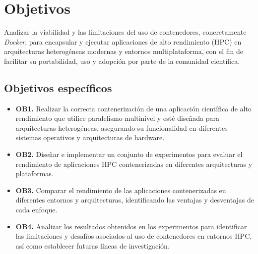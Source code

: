\section{Objetivos}\label{sec:objetivos}

Analizar la viabilidad y las limitaciones del uso de contenedores, concretamente \textit{Docker}, para encapsular y ejecutar aplicaciones de alto rendimiento (HPC) en arquitecturas heterogéneas modernas y entornos multiplataforma, con el fin de facilitar su portabilidad, uso y adopción por parte de la comunidad científica.

\subsection{Objetivos específicos}\label{subsec:objetivos_especificos}

\begin{itemize}
   \item \textbf{OB1.} Realizar la correcta contenerización de una aplicación científica de alto rendimiento que utilice paralelismo multinivel y esté diseñada para arquitecturas heterogéneas, asegurando su funcionalidad en diferentes sistemas operativos y arquitecturas de hardware.
   \item \textbf{OB2.} Diseñar e implementar un conjunto de experimentos para evaluar el rendimiento de aplicaciones \acs{HPC} contenerizadas en diferentes arquitecturas y plataformas.
   \item \textbf{OB3.} Comparar el rendimiento de las aplicaciones contenerizadas en diferentes entornos y arquitecturas, identificando las ventajas y desventajas de cada enfoque.
   \item \textbf{OB4.} Analizar los resultados obtenidos en los experimentos para identificar las limitaciones y desafíos asociados al uso de contenedores en entornos \acs{HPC}, así como establecer futuras líneas de investigación.
\end{itemize}


